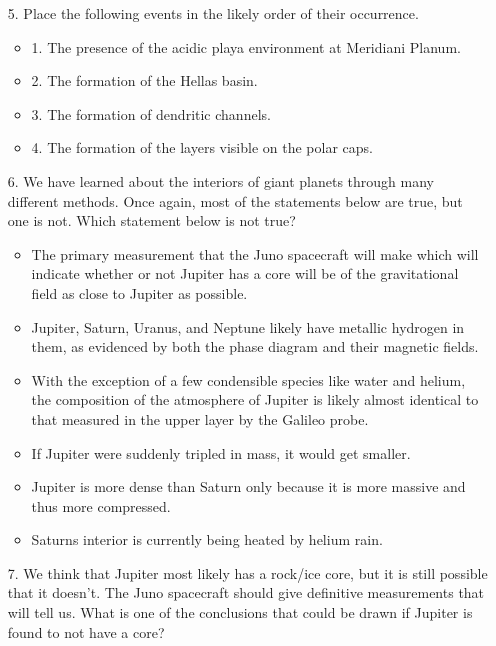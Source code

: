 \begin{enumerate}
    \item[5.] Place the following events in the likely order of their occurrence.
    
    \begin{itemize}[label={$\bullet$}]
        \item 1. The presence of the acidic playa environment at Meridiani Planum.
        \item 2. The formation of the Hellas basin.
        \item 3. The formation of dendritic channels.
        \item 4. The formation of the layers visible on the polar caps.
    \end{itemize}
    
    \item[6.] We have learned about the interiors of giant planets through many different methods. Once again, most of the statements below are true, but one is not. Which statement below is not true?
    
    \begin{itemize}[label={$\bullet$}]
        \item The primary measurement that the Juno spacecraft will make which will indicate whether or not Jupiter has a core will be of the gravitational field as close to Jupiter as possible.
        \item Jupiter, Saturn, Uranus, and Neptune likely have metallic hydrogen in them, as evidenced by both the phase diagram and their magnetic fields.
        \item With the exception of a few condensible species like water and helium, the composition of the atmosphere of Jupiter is likely almost identical to that measured in the upper layer by the Galileo probe.
        \item If Jupiter were suddenly tripled in mass, it would get smaller.
        \item Jupiter is more dense than Saturn only because it is more massive and thus more compressed.
        \item Saturns interior is currently being heated by helium rain.
    \end{itemize}
    
    \item[7.] We think that Jupiter most likely has a rock/ice core, but it is still possible that it doesn’t. The Juno spacecraft should give definitive measurements that will tell us. What is one of the conclusions that could be drawn if Jupiter is found to not have a core?
    

\end{enumerate}
